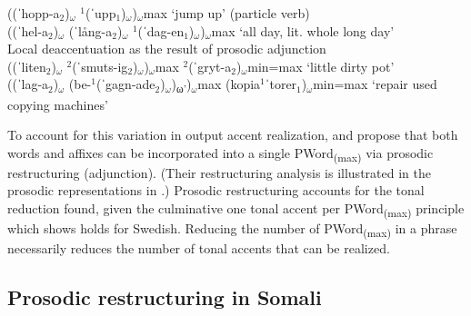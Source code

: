 \documentclass[output=paper]{langscibook}
\begin{document}
((ˈhopp-a$_2$)$_ω$ $^1$(ˈupp$_1$)$_ω$)$_ω$max  ‘jump up’  (particle verb)\\

((ˈhel-a$_2$)$_ω$ (ˈlång-a$_2$)$_ω$ $^1$(ˈdag-en$_1$)$_ω$)$_ω$max ‘all day, lit. whole long day’\\

\ex   Local deaccentuation as the result of prosodic adjunction\label{ex:downing:17c}\\

((ˈliten$_2$)$_ω$ $^2$(ˈsmuts-ig$_2$)$_ω$)$_ω$max $^2$(ˈgryt-a$_2$)$_ω$min=max  ‘little dirty pot’\\
                                                                                                                                       
((ˈlag-a$_2$)$_ω$ (be-$^1$(ˈgagn-ade$_2$)$_ω$)\textsubscript{ω’})$_ω$max (kopia$^1$ˈtorer$_1$)$_ω$min=max ‘repair used copying machines’\\
\z
\z     

{To account for this variation in output accent realization, \citet{Myrberg2015} and \citet{Riad2016} propose that both words and affixes can be incorporated into a single PWord\textsubscript{(max)} via prosodic restructuring (adjunction). (Their restructuring analysis is illustrated in the prosodic representations in .) Prosodic restructuring accounts for the tonal reduction found, given the culminative one tonal accent per PWord\textsubscript{(max)} principle which \citet{Riad2016} shows holds for Swedish. Reducing the number of PWord\textsubscript{(max)} in a phrase necessarily reduces the number of tonal accents that can be realized.}\\

\subsection{Prosodic restructuring in Somali}
\end{document}
